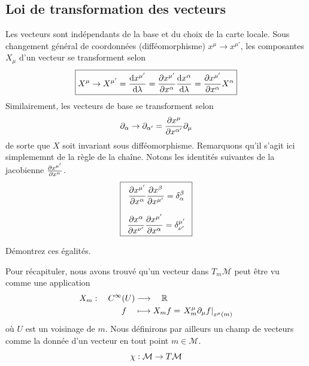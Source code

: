 \subsection{Loi de transformation des vecteurs}
Les vecteurs sont indépendants de la base et du choix de la carte locale. Sous changement général de coordonnées (difféomorphisme) $x^\mu \to x^{\mu'}$, les composantes $X_\mu$ d'un vecteur se transforment selon
    \begin{align}
        \boxed{X^\mu \to X^{\mu'} = \frac{\mathrm{d} x^{\mu'}}{\mathrm{d} \lambda} = \frac{\partial x^{\mu'}}{\partial x^\alpha} \frac{\mathrm{d} x^\alpha}{\mathrm{d} \lambda} = \frac{\partial x^{\mu'}}{\partial x^\alpha} X^\alpha}
    \end{align}
Similairement, les vecteurs de base se transforment selon
\begin{equation}
    \partial_\alpha \to \partial_{\alpha'} = \frac{\partial x^\mu}{\partial x^{\alpha'}} \partial_\mu
\end{equation}
de sorte que $X$ soit invariant sous difféomorphisme. Remarquons qu'il s'agit ici simplememnt de la règle de la chaîne. Notons les identités suivantes de la jacobienne $\frac{\partial x^{\mu'}}{\partial x^\alpha}$.
\begin{align}
    \label{eq: id chgmt de coordonnées}
    \boxed{
        \begin{array}{c}
            \dfrac{\pd x^{\mu'}}{\pd x^\alpha}\dfrac{\pd x^{\beta}}{\pd x^{\mu'}} = \displaystyle \delta^\beta_\alpha  \\
            \\
            \dfrac{\pd x^{\alpha}}{\pd x^{\nu'}}\dfrac{\pd x^{\mu'}}{\pd x^\alpha} =\displaystyle\delta\indices*{^{\mu'}_{\nu'}}
        \end{array} 
    }
\end{align}
\begin{exerc}
    Démontrez ces égalités.
\end{exerc}
Pour récapituler, nous avons trouvé qu'un vecteur dans $T_m\mathcal{M}$ peut être vu comme une application
\begin{align*}
    X_m : \quad C^\infty(U) &\longrightarrow \quad\mathbb{R}\\
    f \quad&\longmapsto X_m f = \left. X^\mu_m \partial_\mu f \right|_{x^\mu(m)}
\end{align*}
où $U$ est un voisinage de $m$. Nous définirons par ailleurs un champ de vecteurs comme la donnée d'un vecteur en tout point $m \in \mathcal{M}$.
\begin{equation}
    \chi: \mathcal{M} \to T\mathcal{M}
\end{equation}
